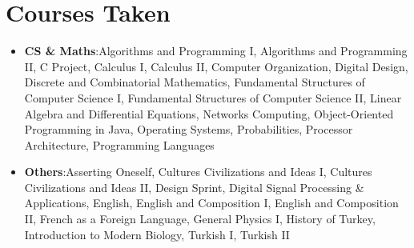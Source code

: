 \documentclass[a4paper,11pt]{article}
\newcommand{\resumeItem}[2]{
    \item{\textbf{#1}{:\hspace{0.5mm}#2 \vspace{-0.5mm}}}
}
\newcommand{\resumeSubItem}[2]{\resumeItem{#1}{#2}\vspace{-4pt}}
\newcommand{\resumeHeadingSkillStart}{\begin{itemize}[leftmargin=*,itemsep=1.7mm, rightmargin=2ex]}
\newcommand{\resumeHeadingSkillEnd}{\end{itemize}\vspace{-2mm}}
\begin{document}
\vspace{-1mm}


\section{\textbf{Courses Taken}}
\resumeHeadingSkillStart
    \resumeSubItem{CS \& Maths}
        {Algorithms and Programming I, Algorithms and Programming II, C Project, Calculus I, Calculus II, Computer Organization, Digital Design, Discrete and Combinatorial Mathematics, Fundamental Structures of Computer Science I, Fundamental Structures of Computer Science II, Linear Algebra and Differential Equations, Networks Computing, Object-Oriented Programming in Java, Operating Systems, Probabilities, Processor Architecture, Programming Languages}
    \resumeSubItem{Others}
        {Asserting Oneself, Cultures Civilizations and Ideas I, Cultures Civilizations and Ideas II, Design Sprint, Digital Signal Processing \& Applications, English, English and Composition I, English and Composition II, French as a Foreign Language, General Physics I, History of Turkey, Introduction to Modern Biology, Turkish I, Turkish II}
\resumeHeadingSkillEnd
\vspace{-1mm}

\end{document}
